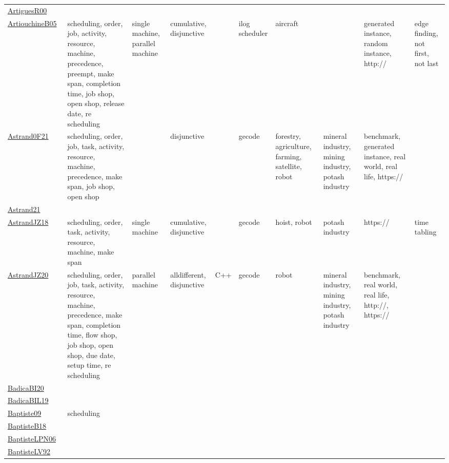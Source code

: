 {\begin{longtable}{p{3cm}p{4cm}p{2cm}p{2cm}p{2cm}p{2cm}p{2cm}p{2cm}p{2cm}p{2cm}}
\href{articles/ArtiguesR00.pdf}{ArtiguesR00}~\cite{ArtiguesR00} &  &  &  &  &  &  &  &  & \\
\href{papers/ArtiouchineB05.pdf}{ArtiouchineB05}~\cite{ArtiouchineB05} & scheduling, order, job, activity, resource, machine, precedence, preempt, make span, completion time, job shop, open shop, release date, re scheduling & single machine, parallel machine & cumulative, disjunctive &  & ilog scheduler & aircraft &  & generated instance, random instance, http:// & edge finding, not first, not last\\
\href{papers/Astrand0F21.pdf}{Astrand0F21}~\cite{Astrand0F21} & scheduling, order, job, task, activity, resource, machine, precedence, make span, job shop, open shop &  & disjunctive &  & gecode & forestry, agriculture, farming, satellite, robot & mineral industry, mining industry, potash industry & benchmark, generated instance, real world, real life, https:// & \\
\href{}{Astrand21}~\cite{Astrand21} &  &  &  &  &  &  &  &  & \\
\href{papers/AstrandJZ18.pdf}{AstrandJZ18}~\cite{AstrandJZ18} & scheduling, order, task, activity, resource, machine, make span & single machine & cumulative, disjunctive &  & gecode & hoist, robot & potash industry & https:// & time tabling\\
\href{articles/AstrandJZ20.pdf}{AstrandJZ20}~\cite{AstrandJZ20} & scheduling, order, job, task, activity, resource, machine, precedence, make span, completion time, flow shop, job shop, open shop, due date, setup time, re scheduling & parallel machine & alldifferent, disjunctive &  C++  & gecode & robot & mineral industry, mining industry, potash industry & benchmark, real world, real life, http://, https:// & \\
\href{articles/BadicaBI20.pdf}{BadicaBI20}~\cite{BadicaBI20} &  &  &  &  &  &  &  &  & \\
\href{papers/BadicaBIL19.pdf}{BadicaBIL19}~\cite{BadicaBIL19} &  &  &  &  &  &  &  &  & \\
\href{papers/Baptiste09.pdf}{Baptiste09}~\cite{Baptiste09} & scheduling &  &  &  &  &  &  &  & \\
\href{articles/BaptisteB18.pdf}{BaptisteB18}~\cite{BaptisteB18} &  &  &  &  &  &  &  &  & \\
\href{}{BaptisteLPN06}~\cite{BaptisteLPN06} &  &  &  &  &  &  &  &  & \\
\href{papers/BaptisteLV92.pdf}{BaptisteLV92}~\cite{BaptisteLV92} &  &  &  &  &  &  &  &  & \\

\end{longtable}}
